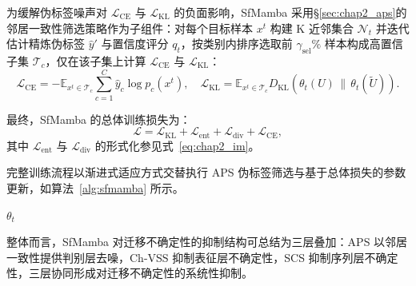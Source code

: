 为缓解伪标签噪声对 $\mathcal{L}_{\text{CE}}$ 与 $\mathcal{L}_{\text{KL}}$ 的负面影响，SfMamba 采用§\ref{sec:chap2_aps}的邻居一致性筛选策略作为子组件：对每个目标样本 $x^t$ 构建 K 近邻集合 $\mathcal{N}_t$ 并迭代估计精炼伪标签 $\hat{y}'$ 与置信度评分 $q_t$，按类别内排序选取前 $\gamma_{\text{sel}}\%$ 样本构成高置信子集 $\mathcal{T}_c$，仅在该子集上计算 $\mathcal{L}_{\text{CE}}$ 与 $\mathcal{L}_{\text{KL}}$：
\begin{equation}
\mathcal{L}_{\text{CE}} = -\mathbb{E}_{x^t \in \mathcal{T}_c} \sum_{c=1}^{C} \hat{y}_c \log p_c(x^t), \quad
\mathcal{L}_{\text{KL}} = \mathbb{E}_{x^t \in \mathcal{T}_c} D_{\text{KL}}\!\left(\theta_t(U) \,\|\, \theta_t(\tilde{U})\right).
\label{eq:scs_loss_ch}
\end{equation}

最终，SfMamba 的总体训练损失为：
\begin{equation}
\mathcal{L} = \mathcal{L}_{\text{KL}} + \mathcal{L}_{\text{ent}} + \mathcal{L}_{\text{div}} + \mathcal{L}_{\text{CE}},
\label{eq:scs_total_loss}
\end{equation}
其中 $\mathcal{L}_{\text{ent}}$ 与 $\mathcal{L}_{\text{div}}$ 的形式化参见式~\eqref{eq:chap2_im}。

完整训练流程以渐进式适应方式交替执行 APS 伪标签筛选与基于总体损失的参数更新，如算法~\ref{alg:sfmamba} 所示。

\begin{algorithm}[!htb]
  \label{alg:sfmamba}
  \small
  \BlankLine
  \Return $\theta_t$
\end{algorithm}

整体而言，SfMamba 对迁移不确定性的抑制结构可总结为三层叠加：APS 以邻居一致性提供判别层去噪，Ch-VSS 抑制表征层不确定性，SCS 抑制序列层不确定性，三层协同形成对迁移不确定性的系统性抑制。


